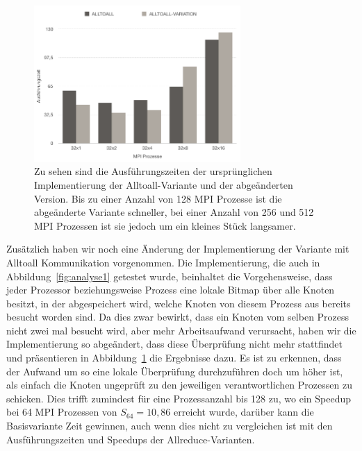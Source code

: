 \documentclass[11pt,a4paper]{article}
\begin{document}
\begin{figure}[h]
 	\centering
	\includegraphics[width=0.7\textwidth]{alltoall_variation}
 	\caption{Zu sehen sind die Ausführungszeiten der ursprünglichen Implementierung der Alltoall-Variante und der abgeänderten Version. Bis zu einer Anzahl von 128 MPI Prozesse ist die abgeänderte Variante schneller, bei einer Anzahl von 256 und 512 MPI Prozessen ist sie jedoch um ein kleines Stück langsamer.}
	\label{fig:alltoall_change}
\end{figure}
Zusätzlich haben wir noch eine Änderung der Implementierung der Variante mit Alltoall Kommunikation vorgenommen. Die Implementierung, die auch in Abbildung~\ref{fig:analyse1} getestet wurde, beinhaltet die Vorgehensweise, dass jeder Prozessor beziehungsweise Prozess eine lokale Bitmap über alle Knoten besitzt, in der abgespeichert wird, welche Knoten von diesem Prozess aus bereits besucht worden sind. Da dies zwar bewirkt, dass ein Knoten vom selben Prozess nicht zwei mal besucht wird, aber mehr Arbeitsaufwand verursacht, haben wir die Implementierung so abgeändert, dass diese Überprüfung nicht mehr stattfindet und präsentieren in Abbildung~\ref{fig:alltoall_change} die Ergebnisse dazu. Es ist zu erkennen, dass der Aufwand um so eine lokale Überprüfung durchzuführen doch um höher ist, als einfach die Knoten ungeprüft zu den jeweiligen verantwortlichen Prozessen zu schicken. Dies trifft zumindest für eine Prozessanzahl bis 128 zu, wo ein Speedup bei 64 MPI Prozessen von \(S_{64} = 10,86\) erreicht wurde, darüber kann die Basisvariante Zeit gewinnen, auch wenn dies nicht zu vergleichen ist mit den Ausführungszeiten und Speedups der Allreduce-Varianten.
\end{document}

